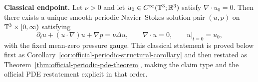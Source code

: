 \maketitle

\begin{tcolorbox}[title={Main endpoint theorem (Fefferman (B), periodic case)}, colback=blue!2!white, colframe=blue!55!black]
\textbf{Classical endpoint.}
Let $\nu>0$ and let $u_0\in C^\infty(\mathbb{T}^3;\mathbb{R}^3)$ satisfy $\nabla\cdot u_0=0$.
Then there exists a unique smooth periodic Navier--Stokes solution pair $(u,p)$ on
$\mathbb{T}^3\times[0,\infty)$ satisfying
\[
\partial_t u + (u\cdot\nabla)u + \nabla p = \nu\Delta u,
\qquad \nabla\cdot u = 0,
\qquad u|_{t=0}=u_0,
\]
with the fixed mean-zero pressure gauge.
This classical statement is proved below first as Corollary~\ref{cor:official-periodic-structural-corollary} and then restated as Theorem~\ref{thm:official-periodic-pde-theorem}, making the claim type and the official PDE restatement explicit in that order.
\end{tcolorbox}

